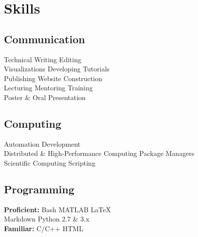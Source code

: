\documentclass[letterpaper]{deedy-resume} %
\begin{document}
\begin{minipage}[t]{0.32\textwidth}
\section{Skills}

\subsection{Communication}
Technical Writing \textbullet{} Editing\\
Visualizations \textbullet{} Developing Tutorials\\
Publishing \textbullet{} Website Construction\\
Lecturing \textbullet{} Mentoring \textbullet{} Training\\
Poster \& Oral Presentation

\sectionspace

\subsection{Computing}
Automation \textbullet{} Development\\
Distributed \& High-Performance Computing \textbullet{} Package Managers\\
Scientific Computing \textbullet{} Scripting

\sectionspace

\subsection{Programming}
\textbf{Proficient:}	Bash \textbullet{} MATLAB \textbullet{} LaTeX\\
Markdown \textbullet{} Python 2.7 \& 3.x\\
\textbf{Familiar:}	C$/$C++ \textbullet{} HTML


\end{minipage}
\end{document}
